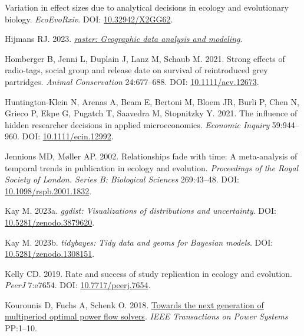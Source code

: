 \documentclass[10pt,a4paper]{article}
\newlength{\cslhangindent}
\newenvironment{CSLReferences}[2] %
 {\begin{list}{}{%
  \setlength{\itemindent}{0pt}
  \setlength{\leftmargin}{0pt}
  \setlength{\parsep}{0pt}
  \ifodd #1
   \setlength{\leftmargin}{\cslhangindent}
   \setlength{\itemindent}{-1\cslhangindent}
  \fi
  \setlength{\itemsep}{#2\baselineskip}}}
 {\end{list}}
\begin{document}
\begin{CSLReferences}{1}{0}
Variation in effect sizes due to analytical decisions in ecology and evolutionary biology. \emph{EcoEvoRxiv}. DOI: \href{https://doi.org/10.32942/X2GG62}{10.32942/X2GG62}.

Hijmans RJ. 2023. \emph{\href{https://CRAN.R-project.org/package=raster}{{raster}: Geographic data analysis and modeling}}.

Homberger B, Jenni L, Duplain J, Lanz M, Schaub M. 2021. Strong effects of radio-tags, social group and release date on survival of reintroduced grey partridges. \emph{Animal Conservation} 24:677--688. DOI: \href{https://doi.org/10.1111/acv.12673}{10.1111/acv.12673}.

Huntington‐Klein N, Arenas A, Beam E, Bertoni M, Bloem JR, Burli P, Chen N, Grieco P, Ekpe G, Pugatch T, Saavedra M, Stopnitzky Y. 2021. The influence of hidden researcher decisions in applied microeconomics. \emph{Economic Inquiry} 59:944--960. DOI: \href{https://doi.org/10.1111/ecin.12992}{10.1111/ecin.12992}.

Jennions MD, Møller AP. 2002. Relationships fade with time: A meta-analysis of temporal trends in publication in ecology and evolution. \emph{Proceedings of the Royal Society of London. Series B: Biological Sciences} 269:43--48. DOI: \href{https://doi.org/10.1098/rspb.2001.1832}{10.1098/rspb.2001.1832}.

Kay M. 2023a. \emph{{ggdist}: Visualizations of distributions and uncertainty}. DOI: \href{https://doi.org/10.5281/zenodo.3879620}{10.5281/zenodo.3879620}.

Kay M. 2023b. \emph{{tidybayes}: Tidy data and geoms for {Bayesian} models}. DOI: \href{https://doi.org/10.5281/zenodo.1308151}{10.5281/zenodo.1308151}.

Kelly CD. 2019. Rate and success of study replication in ecology and evolution. \emph{PeerJ} 7:e7654. DOI: \href{https://doi.org/10.7717/peerj.7654}{10.7717/peerj.7654}.

Kourounis D, Fuchs A, Schenk O. 2018. \href{https://doi.org/10.1109/TPWRS.2017.2789187}{Towards the next generation of multiperiod optimal power flow solvers}. \emph{IEEE Transactions on Power Systems} PP:1--10.


\end{CSLReferences}
\end{document}
